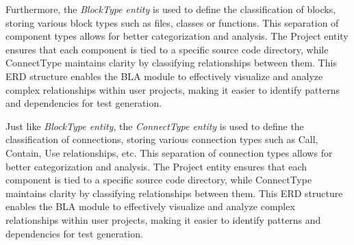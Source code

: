 \hspace{0.5cm}Furthermore, the \textit{BlockType entity} is used to define the classification of blocks, storing various block types such as files, classes or functions. This separation of component types allows for better categorization and analysis. The Project entity ensures that each component is tied to a specific source code directory, while ConnectType maintains clarity by classifying relationships between them. This ERD structure enables the BLA module to effectively visualize and analyze complex relationships within user projects, making it easier to identify patterns and dependencies for test generation.

\hspace{0.5cm} Just like \textit{BlockType entity}, the \textit{ConnectType entity} is used to define the classification of connections, storing various connection types such as Call, Contain, Use relationships, etc. This separation of connection types allows for better categorization and analysis. The Project entity ensures that each component is tied to a specific source code directory, while ConnectType maintains clarity by classifying relationships between them. This ERD structure enables the BLA module to effectively visualize and analyze complex relationships within user projects, making it easier to identify patterns and dependencies for test generation.
                                                                                                                                              


